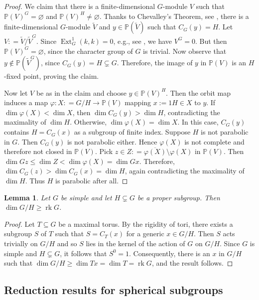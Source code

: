 \documentclass[12pt]{amsart}
\renewcommand{\phi}{\varphi}
\newcommand{\leer}{\varnothing}
\renewcommand{\tilde}{\widetilde}
\newcommand\Ext{{\operatorname{Ext}}}
\newcommand\rk{\operatorname{rk}}
\numberwithin{equation}{section}
\newtheorem{lemma}[lemma]{Lemma}
\theoremstyle{definition}
\begin{document}
\begin{proof}
  We claim that there is a finite-dimensional $G$-module $V$ such that
  $\mathbb{P}(V)^G = \leer$ and $\mathbb{P}(V)^H \ne \leer$.  Thanks
  to Chevalley's Theorem, see \cite[Ch.~II, Thm.~5.1]{borel}, there is
  a finite-dimensional $G$-module $\tilde V$ and
  $y \in \mathbb{P}(\tilde V)$ such that $C_G(y) = H$.  Let
  $V: = \tilde{V}/\tilde{V}^G$.  Since $\Ext_G^1(k,k) = 0$, e.g.,
  see \cite[(2.12(1))]{jantzen}, we have $V^G = 0$. But then
  $\mathbb{P}(V)^G = \leer$, since the character group of $G$ is
  trivial. Now observe that $y \notin \mathbb{P}(\tilde V^G)$, since
  $C_G(y) = H \subsetneq G$. Therefore, the image of $y$ in
  $\mathbb{P}(V)$ is an $H$-fixed point, proving the claim.
	
  Now let $V$ be as in the claim and choose $y\in \mathbb{P}(V)^H$.
  Then the orbit map induces a map
  $\phi : X : = G/H \to \mathbb{P}(V)$ mapping $x := 1H\in X$ to $y$.
  If $\dim \phi (X) < \dim X$, then $\dim C_G(y) > \dim H$,
  contradicting the maximality of $\dim H$.  Otherwise,
  $\dim \phi (X) = \dim X$. In this case, $C_G(y)$ contains
  $H = C_G(x)$ as a subgroup of finite index. Suppose $H$ is not
  parabolic in $G$. Then $C_G(y)$ is not parabolic either. Hence
  $\phi (X)$ is not complete and therefore not closed in
  $\mathbb{P}(V)$.  Pick
  $z\in Z : = \overline {\phi(X)} \setminus \phi(X)$ in
  $\mathbb{P}(V)$.  Then
  $\dim Gz \leqslant \dim Z < \dim \phi(X) = \dim Gx$. Therefore,
  $\dim C_G(z) > \dim C_G(x) = \dim H$, again contradicting the
  maximality of $\dim H$. Thus $H$ is parabolic after all.
\end{proof}

\begin{lemma}
  \label{lem:4}
  Let $G$ be simple and let $H\subsetneq G$ be a proper subgroup. Then
  $\dim G/H \geqslant \rk G$.
\end{lemma}


\begin{proof}
  Let $T \subseteq G$ be a maximal torus.  By the rigidity of tori,
  there exists a subgroup $S$ of $T$ such that $S = C_T(x)$ for a
  generic $x \in G/H$. Then $S$ acts trivially on $G/H$ and so $S$
  lies in the kernel of the action of $G$ on $G/H$. Since $G$ is
  simple and $H \subsetneq G$, it follows that $S^0 =
  1$. Consequently, there is an $x$ in $G/H$ such that
  $\dim G/H \geqslant \dim Tx = \dim T = \rk G$, and the result follows.
\end{proof}

\subsection{Reduction results for spherical subgroups}
\end{document}
